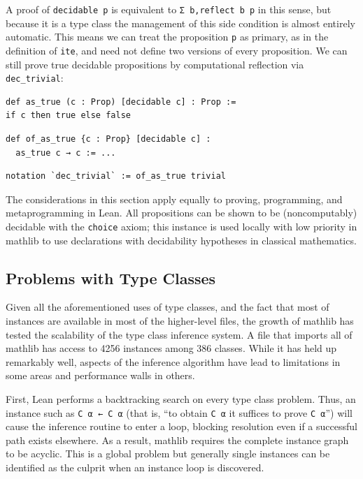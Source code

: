 \documentclass[sigplan]{acmart}\settopmatter{}
\newcommand{\mathlib}{\textsf{mathlib}\xspace}
\begin{document}
A proof of \lstinline{decidable p} is equivalent to \lstinline{Σ b,reflect b p} in this sense, but because it is a type class the management of this side condition is almost entirely automatic.
This means we can treat the proposition \lstinline{p} as primary, as in the definition of \lstinline{ite}, and need not define two versions of every proposition.
We can still prove true decidable propositions by computational reflection via \lstinline{dec_trivial}:
\begin{lstlisting}
def as_true (c : Prop) [decidable c] : Prop :=
if c then true else false
\end{lstlisting}
\begin{lstlisting}
def of_as_true {c : Prop} [decidable c] :
  as_true c → c := ...
\end{lstlisting}
\begin{lstlisting}
notation `dec_trivial` := of_as_true trivial
\end{lstlisting}

The considerations in this section apply equally to proving, programming, and metaprogramming in Lean.
All propositions can be shown to be (noncomputably) decidable with the \lstinline{choice} axiom;
this instance is used locally with low priority in \mathlib
to use declarations with decidability hypotheses in classical mathematics.

\subsection{Problems with Type Classes}
\label{subsection:typeclasses:bad}

Given all the aforementioned uses of type classes, 
and the fact that most of instances are available in most of the higher-level files, 
the growth of \mathlib has tested the scalability of the type class inference system.
A file that imports all of \mathlib has access to 4256 instances among 386 classes.
While it has held up remarkably well, aspects of the inference algorithm have lead to limitations in some areas and performance walls in others.

First, Lean performs a backtracking search on every type class problem.
Thus, an instance such as \lstinline{C α ← C α} (that is, ``to obtain \lstinline{C α} it suffices to prove \lstinline{C α}'') will cause the inference routine to enter a loop, blocking resolution even if a successful path exists elsewhere.
As a result, \mathlib requires the complete instance graph to be acyclic.
This is a global problem but generally single instances can be identified as the culprit when an instance loop is discovered.
\end{document}
